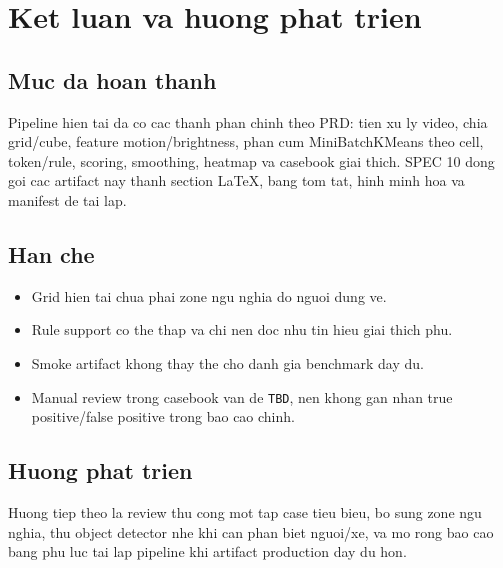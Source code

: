 \chapter{Ket luan va huong phat trien}

\section{Muc da hoan thanh}

Pipeline hien tai da co cac thanh phan chinh theo PRD: tien xu ly video, chia grid/cube, feature motion/brightness, phan cum MiniBatchKMeans theo cell, token/rule, scoring, smoothing, heatmap va casebook giai thich. SPEC 10 dong goi cac artifact nay thanh section LaTeX, bang tom tat, hinh minh hoa va manifest de tai lap.

\section{Han che}

\begin{itemize}
  \item Grid hien tai chua phai zone ngu nghia do nguoi dung ve.
  \item Rule support co the thap va chi nen doc nhu tin hieu giai thich phu.
  \item Smoke artifact khong thay the cho danh gia benchmark day du.
  \item Manual review trong casebook van de \texttt{TBD}, nen khong gan nhan true positive/false positive trong bao cao chinh.
\end{itemize}


\section{Huong phat trien}

Huong tiep theo la review thu cong mot tap case tieu bieu, bo sung zone ngu nghia, thu object detector nhe khi can phan biet nguoi/xe, va mo rong bao cao bang phu luc tai lap pipeline khi artifact production day du hon.
